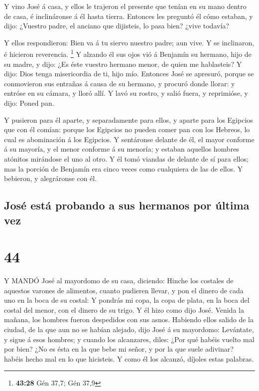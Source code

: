  Y vino José á casa, y ellos le trajeron el presente que
tenían en su mano dentro de casa, é inclináronse á él hasta tierra.
 Entonces les preguntó él cómo estaban, y dijo: ¿Vuestro
padre, el anciano que dijisteis, lo pasa bien? ¿vive todavía?

 Y ellos respondieron: Bien va á tu siervo nuestro padre;
aun vive. Y se inclinaron, é hicieron reverencia. \footnote{\textbf{43:28}
  Gén 37,7; Gén 37,9}  Y alzando él sus ojos vió á Benjamín
su hermano, hijo de su madre, y dijo: ¿Es éste vuestro hermano menor, de
quien me hablasteis? Y dijo: Dios tenga misericordia de ti, hijo mío.
 Entonces José se apresuró, porque se conmovieron sus
entrañas á causa de su hermano, y procuró donde llorar: y entróse en su
cámara, y lloró allí.  Y lavó su rostro, y salió fuera, y
reprimióse, y dijo: Poned pan.

 Y pusieron para él aparte, y separadamente para ellos, y
aparte para los Egipcios que con él comían: porque los Egipcios no
pueden comer pan con los Hebreos, lo cual es abominación á los Egipcios.
 Y sentáronse delante de él, el mayor conforme á su
mayoría, y el menor conforme á su menoría; y estaban aquellos hombres
atónitos mirándose el uno al otro.  Y él tomó viandas de
delante de sí para ellos; mas la porción de Benjamín era cinco veces
como cualquiera de las de ellos. Y bebieron, y alegráronse con él.

\hypertarget{josuxe9-estuxe1-probando-a-sus-hermanos-por-uxfaltima-vez}{%
\subsection{José está probando a sus hermanos por última
vez}\label{josuxe9-estuxe1-probando-a-sus-hermanos-por-uxfaltima-vez}}

\hypertarget{section-43}{%
\section{44}\label{section-43}}

 Y MANDÓ José al mayordomo de su casa, diciendo: Hinche los
costales de aquestos varones de alimentos, cuanto pudieren llevar, y pon
el dinero de cada uno en la boca de su costal:  Y pondrás mi
copa, la copa de plata, en la boca del costal del menor, con el dinero
de su trigo. Y él hizo como dijo José.  Venida la mañana,
los hombres fueron despedidos con sus asnos.  Habiendo ellos
salido de la ciudad, de la que aun no se habían alejado, dijo José á su
mayordomo: Levántate, y sigue á esos hombres; y cuando los alcanzares,
diles: ¿Por qué habéis vuelto mal por bien?  ¿No es ésta en
la que bebe mi señor, y por la que suele adivinar? habéis hecho mal en
lo que hicisteis.  Y como él los alcanzó, díjoles estas
palabras.

